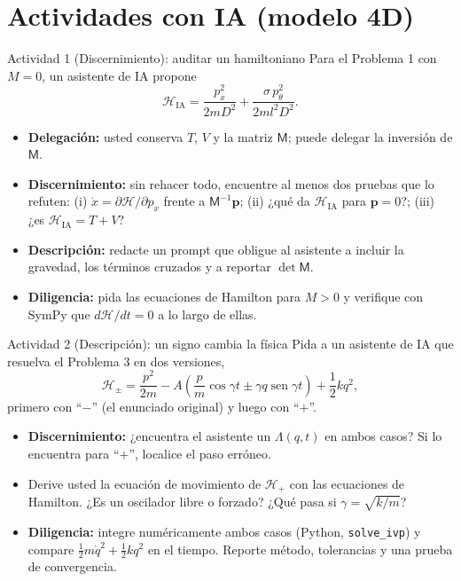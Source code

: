 \documentclass[spanish]{beamer}
\providecommand{\sen}{\operatorname{sen}}
\newcommand{\Ham}{\mathcal{H}}
\begin{document}
\section{Actividades con IA (modelo 4D)}

\begin{frame}{Actividad 1 (Discernimiento): auditar un hamiltoniano}
Para el Problema 1 con $M=0$, un asistente de IA propone
\[
  \Ham_{\text{IA}} = \frac{p_x^2}{2mD^2} + \frac{\sigma\,p_\theta^2}{2ml^2D^2} .
\]
\begin{itemize}
  \item<2-> \textbf{Delegación:} usted conserva $T$, $V$ y la matriz $\mathsf M$;
        puede delegar la inversión de $\mathsf M$.
  \item<3-> \textbf{Discernimiento:} sin rehacer todo, encuentre al menos dos
        pruebas que lo refuten:
        (i) $\dot x = \partial\Ham/\partial p_x$ frente a $\mathsf M^{-1}\mathbf p$;
        (ii) ¿qué da $\Ham_{\text{IA}}$ para $\mathbf p = 0$?;
        (iii) ¿es $\Ham_{\text{IA}} = T+V$?
  \item<4-> \textbf{Descripción:} redacte un prompt que obligue al asistente a
        incluir la gravedad, los términos cruzados y a reportar $\det\mathsf M$.
  \item<5-> \textbf{Diligencia:} pida las ecuaciones de Hamilton para $M>0$ y
        verifique con SymPy que $d\Ham/dt = 0$ a lo largo de ellas.
\end{itemize}
\end{frame}

\begin{frame}{Actividad 2 (Descripción): un signo cambia la física}
Pida a un asistente de IA que resuelva el Problema 3 en dos versiones,
\[
  \Ham_\pm = \frac{p^2}{2m} - A\left( \frac{p}{m}\cos\gamma t \pm \gamma q\sen\gamma t\right)
           + \frac12 kq^2 ,
\]
primero con ``$-$'' (el enunciado original) y luego con ``$+$''.
\begin{itemize}
  \item<2-> \textbf{Discernimiento:} ¿encuentra el asistente un $\Lambda(q,t)$ en
        ambos casos? Si lo encuentra para ``$+$'', localice el paso erróneo.
  \item<3-> Derive usted la ecuación de movimiento de $\Ham_+$ con las ecuaciones de
        Hamilton. ¿Es un oscilador libre o forzado? ¿Qué pasa si $\gamma = \sqrt{k/m}$?
  \item<4-> \textbf{Diligencia:} integre numéricamente ambos casos (Python,
        \texttt{solve\_ivp}) y compare $\frac12 m\dot q^2 + \frac12kq^2$ en el tiempo.
        Reporte método, tolerancias y una prueba de convergencia.
\end{itemize}
\end{frame}
\end{document}
